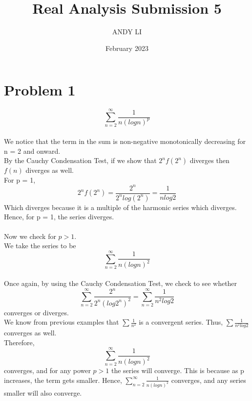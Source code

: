 \documentclass{article}
\title{Real Analysis Submission 5}
\author{ANDY LI}
\date{February 2023}
\begin{document}
\maketitle

\section*{Problem 1}
$$\sum_{n=2}^{\infty} \frac{1}{n(logn)^p}$$
\\We notice that the term in the sum is non-negative monotonically decreasing for n = 2 and onward.
\\By the Cauchy Condensation Test, if we show that $2^nf(2^n)$ diverges then $f(n)$ diverges as well.
\\For p = 1,
$$2^nf(2^n) = \frac{2^n}{2^nlog(2^n)} = \frac{1}{nlog2}$$ Which diverges because it is a multiple of the harmonic series which diverges.
\\Hence, for p = 1, the series diverges.
\\
\\Now we check for $p > 1$.
\\We take the series to be $$\sum_{n=2}^{\infty} \frac{1}{n(logn)^2}$$
\\Once again, by using the Cauchy Condensation Test, we check to see whether $$\sum_{n=2}^{\infty} \frac{2^n}{2^n(log2^n)^2} = \sum_{n=2}^{\infty} \frac{1}{n^2log2}$$ converges or diverges.
\\We know from previous examples that $\sum\frac{1}{n^2}$ is a convergent series. Thus, $\sum\frac{1}{n^2log2}$ converges as well.
\\Therefore, $$\sum_{n=2}^{\infty} \frac{1}{n(logn)^2}$$ converges, and for any power $p > 1$ the series will converge. This is because as p increases, the term gets smaller. Hence, $\sum_{n=2}^{\infty} \frac{1}{n(logn)^2}$ converges, and any series smaller will also converge.
\end{document}
